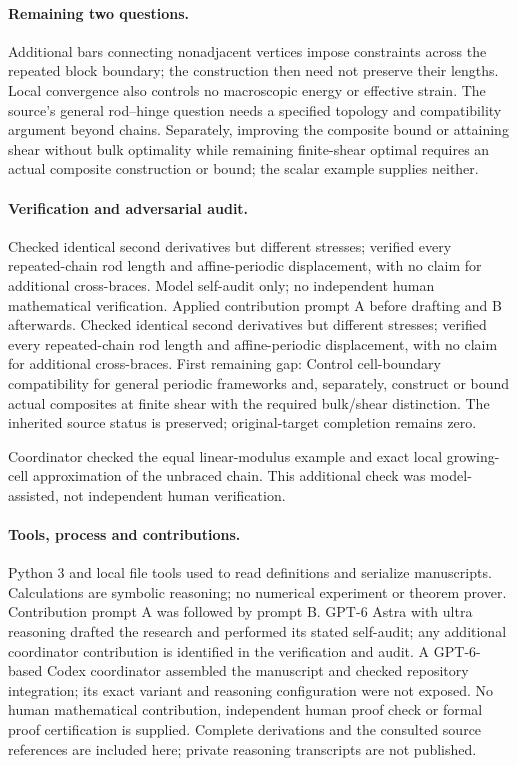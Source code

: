 \documentclass[11pt]{article}
\begin{document}
\paragraph{Remaining two questions.} Additional bars connecting nonadjacent vertices impose constraints across the repeated block boundary; the construction then need not preserve their lengths. Local convergence also controls no macroscopic energy or effective strain. The source's general rod--hinge question needs a specified topology and compatibility argument beyond chains. Separately, improving the composite bound or attaining shear without bulk optimality while remaining finite-shear optimal requires an actual composite construction or bound; the scalar example supplies neither.

\paragraph{Verification and adversarial audit.}
Checked identical second derivatives but different stresses; verified every repeated-chain rod length and affine-periodic displacement, with no claim for additional cross-braces. Model self-audit only; no independent human mathematical verification. Applied contribution prompt A before drafting and B afterwards. Checked identical second derivatives but different stresses; verified every repeated-chain rod length and affine-periodic displacement, with no claim for additional cross-braces. First remaining gap: Control cell-boundary compatibility for general periodic frameworks and, separately, construct or bound actual composites at finite shear with the required bulk/shear distinction. The inherited source status is preserved; original-target completion remains zero.

Coordinator checked the equal linear-modulus example and exact local growing-cell approximation of the unbraced chain. This additional check was model-assisted, not independent human verification.

\paragraph{Tools, process and contributions.}
Python 3 and local file tools used to read definitions and serialize manuscripts. Calculations are symbolic reasoning; no numerical experiment or theorem prover. Contribution prompt A was followed by prompt B. GPT-6 Astra with ultra reasoning drafted the research and performed its stated self-audit; any additional coordinator contribution is identified in the verification and audit. A GPT-6-based Codex coordinator assembled the manuscript and checked repository integration; its exact variant and reasoning configuration were not exposed. No human mathematical contribution, independent human proof check or formal proof certification is supplied. Complete derivations and the consulted source references are included here; private reasoning transcripts are not published.
\end{document}
